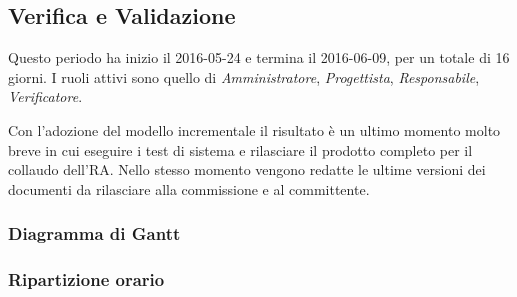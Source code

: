 \newpage

\subsection{Verifica e Validazione}
Questo periodo ha inizio il 2016-05-24 e termina il 2016-06-09, per un totale di 16 giorni.
I ruoli attivi sono quello di \textit{Amministratore}, \textit{Progettista}, \textit{Responsabile}, \textit{Verificatore}.

Con l'adozione del modello incrementale il risultato \`e un ultimo momento molto breve in cui eseguire i test di sistema e rilasciare il prodotto completo per il collaudo dell'RA. Nello stesso momento vengono redatte le ultime versioni dei documenti da rilasciare alla commissione e al committente.

\subsubsection{Diagramma di Gantt}

\subsubsection{Ripartizione orario}


